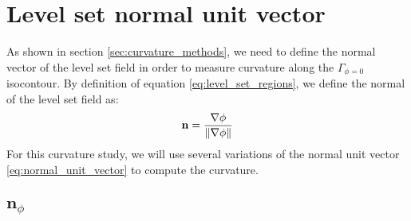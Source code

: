 \section{Level set normal unit vector}
\label{sec:normal_unit_vector}

As shown in section \ref{sec:curvature_methods}, we need to define the normal vector of the level set field in order to measure curvature along the $\Gamma_{\phi=0}$ isocontour. By definition of equation \ref{eq:level_set_regions}, we define the normal of the level set field as:
%
\begin{equation}
	\centering
	\label{eq:normal_unit_vector}
	\mathbf{n} = \frac{\nabla \phi}{\Vert \nabla \phi \Vert}
\end{equation}
%
For this curvature study, we will use several variations of the normal unit vector \ref{eq:normal_unit_vector} to compute the curvature.


\subsection{$\mathbf{n}_{\phi}$}
\label{sec:nphi}

